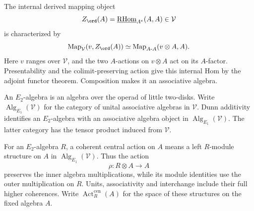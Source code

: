 The internal derived mapping object
\begin{equation}\label{eq:cbc:center:internal}
 Z_{\ord}(A)=
 \underline{\operatorname{RHom}}_{A^e}(A,A)\in\mathcal V
\end{equation}
is characterized by
\begin{equation}\label{eq:cbc:center:representing}
 \operatorname{Map}_{\mathcal V}(v,Z_{\ord}(A))
 \simeq
 \operatorname{Map}_{A\text{-}A}(v\otimes A,A).
\end{equation}
Here $v$ ranges over $\mathcal V$, and the two $A$-actions on $v\otimes A$ act on its $A$-factor.
Presentability and the colimit-preserving action give this internal Hom by the adjoint functor theorem.
Composition makes it an associative algebra.

An $E_2$-algebra is an algebra over the operad of little two-disks.
Write $\operatorname{Alg}_{E_1}(\mathcal V)$ for the category of unital associative algebras in $\mathcal V$.
Dunn additivity identifies an $E_2$-algebra with an associative algebra object in $\operatorname{Alg}_{E_1}(\mathcal V)$.
The latter category has the tensor product induced from $\mathcal V$.

For an $E_2$-algebra $R$, a coherent central action on $A$ means a left $R$-module structure on $A$ in $\operatorname{Alg}_{E_1}(\mathcal V)$.
Thus the action
\[
 \rho:R\otimes A\longrightarrow A
\]
preserves the inner algebra multiplications, while its module identities use the outer multiplication on $R$.
Units, associativity and interchange include their full higher coherences.
Write $\operatorname{Act}^{\mathrm{cen}}_R(A)$ for the space of these structures on the fixed algebra $A$.

